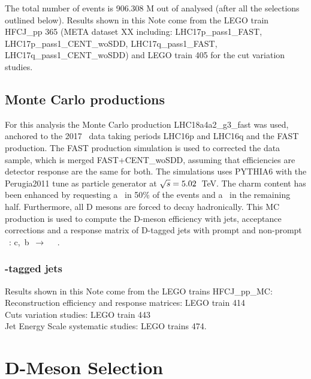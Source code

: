 The total number of events is 906.308  M  out of  analysed (after all the selections outlined below).
Results shown in this Note come from the LEGO train HFCJ\_pp 365 (META dataset {\color{red} XX} including: LHC17p\_pass1\_FAST, LHC17p\_pass1\_CENT\_woSDD, LHC17q\_pass1\_FAST, LHC17q\_pass1\_CENT\_woSDD) and LEGO train 405 for the cut variation studies.

\subsection{Monte Carlo productions}

For this analysis the Monte Carlo production LHC18a4a2\_g3\_fast was used, anchored to the 2017 \pp\ data taking periods LHC16p and LHC16q and the FAST production. The FAST production simulation is used to corrected the data sample, which is merged FAST+CENT\_woSDD, assuming that efficiencies are detector response are the same for both.
The simulations uses PYTHIA6 with the Perugia2011 tune as particle generator at $\sqrt{s}=5.02$~TeV.
The charm content has been enhanced by requesting a \ccbar\ in 50\% of the events and a \bbbar\ in the remaining half.
Furthermore, all D mesons are forced to decay hadronically.
This MC production is used to compute the D-meson efficiency with jets, acceptance corrections and a response matrix of D-tagged jets with prompt and non-prompt \Dzero\ : c,~b~$\rightarrow$ ~\Dzero\ .


\subsubsection{\Dzero-tagged jets}
Results shown in this Note come from the LEGO trains HFCJ\_pp\_MC:  
\\Reconstruction efficiency and response matrices: LEGO train {414}
\\Cuts variation studies: LEGO train {443}
\\Jet Energy Scale systematic studies: LEGO trains 474.



\section{D-Meson Selection}
\label{sec:DmesonSel}

